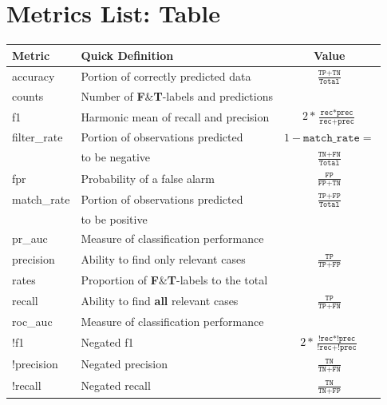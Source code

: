 \documentclass[12pt,a4paper]{article}
\begin{document}
\section{Metrics List: Table}
\begin{tabular}{|l|l|c|}
\hline
\textbf{Metric} & \textbf{Quick Definition} & \textbf{Value}\\\hline \hline
accuracy & Portion of correctly predicted data & $\frac{\texttt{TP}+\texttt{TN}}{\texttt{Total}}$\\\hline
counts & Number of \textbf{F}\&\textbf{T}-labels and predictions&\\\hline
f1 & Harmonic mean of recall and precision & $2*\frac{\texttt{rec} * \texttt{prec}}{\texttt{rec}+\texttt{prec}}$\\\hline
filter\_rate & Portion of observations predicted & $1-\texttt{match\_rate} =$\\ &to be negative&$\frac{\texttt{TN}+\texttt{FN}}{\texttt{Total}}$\\\hline
fpr & Probability of a false alarm & $\frac{\texttt{FP}}{\texttt{FP} + \texttt{TN}}$\\\hline
match\_rate & Portion of observations predicted & $\frac{\texttt{TP}+\texttt{FP}}{\texttt{Total}}$\\ &to be positive&\\\hline
pr\_auc & Measure of classification performance &\\\hline
precision & Ability to find only relevant cases & $\frac{\texttt{TP}}{\texttt{TP} + \texttt{FP}}$\\\hline
rates & Proportion of \textbf{F}\&\textbf{T}-labels to the total&\\\hline
recall & Ability to find \textbf{all} relevant cases & $\frac{\texttt{TP}}{\texttt{TP} + \texttt{FN}}$\\\hline
roc\_auc & Measure of classification performance &\\\hline
!f1 & Negated f1 & $2*\frac{\texttt{!rec} * \texttt{!prec}}{\texttt{!rec}+\texttt{!prec}}$\\\hline
!precision & Negated precision & $\frac{\texttt{TN}}{\texttt{TN} + \texttt{FN}}$ \\\hline
!recall & Negated recall & $\frac{\texttt{TN}}{\texttt{TN} + \texttt{FP}}$\\\hline
\end{tabular}
%
%
%
\end{document}
